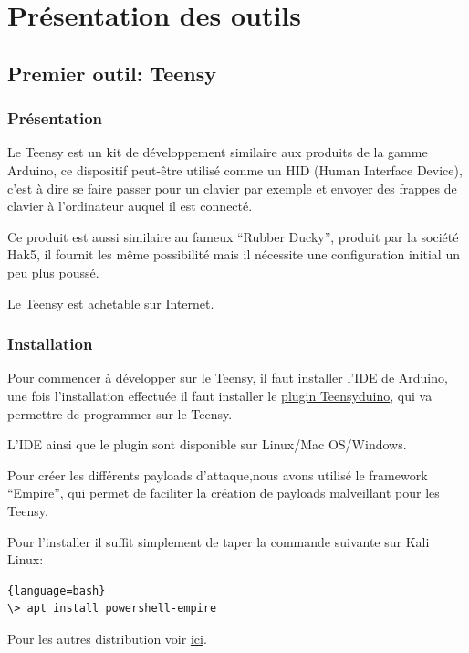 \section{Présentation des outils}

\subsection{Premier outil: Teensy}

\subsubsection{Présentation}

Le Teensy est un kit de développement similaire aux produits de la gamme Arduino, 
ce dispositif peut-être utilisé comme un HID (Human Interface Device), 
c’est à dire se faire passer pour un clavier par exemple et envoyer des frappes de clavier à l’ordinateur 
auquel il est connecté.

Ce produit est aussi similaire au fameux “Rubber Ducky”, produit par la société Hak5, 
il fournit les même possibilité mais il nécessite une configuration initial un peu plus poussé.

Le Teensy est achetable sur Internet.

\subsubsection{Installation}
Pour commencer à développer sur le Teensy, il faut installer \href{https://www.arduino.cc/en/main/software}{l’IDE de Arduino}, 
une fois l’installation effectuée il faut installer le \href{https://www.pjrc.com/teensy/teensyduino.html}{plugin Teensyduino}, qui va permettre de programmer sur le Teensy.

L'IDE ainsi que le plugin sont disponible sur Linux/Mac OS/Windows.

Pour créer les différents payloads d’attaque,nous avons utilisé le framework “Empire”, qui permet de faciliter 
la création de payloads malveillant pour les Teensy.

Pour l’installer il suffit simplement de taper la commande suivante sur Kali Linux:

\begin{lstlisting}{language=bash}
\> apt install powershell-empire
\end{lstlisting}

Pour les autres distribution voir \href{https://github.com/BC-SECURITY/Empire/tree/dev}{ici}. 

